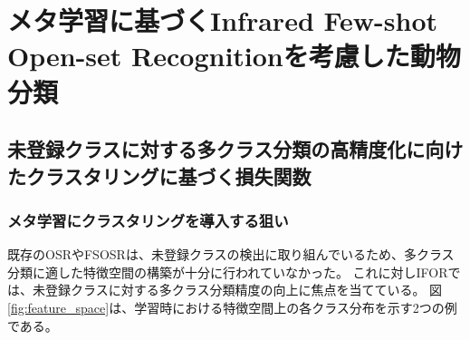 \documentclass[a4paper,11pt,nomag]{jsreport}
\begin{document}
\setcounter{chapter}{3}

\chapter*{メタ学習に基づくInfrared Few-shot Open-set Recognitionを考慮した動物分類}

\section{未登録クラスに対する多クラス分類の高精度化に向けたクラスタリングに基づく損失関数}

\subsection{メタ学習にクラスタリングを導入する狙い}
既存のOSRやFSOSRは、未登録クラスの検出に取り組んでいるため、多クラス分類に適した特徴空間の構築が十分に行われていなかった。
これに対しIFORでは、未登録クラスに対する多クラス分類精度の向上に焦点を当てている。
図 \ref{fig:feature_space}は、学習時における特徴空間上の各クラス分布を示す2つの例である。
% 
\end{document}
